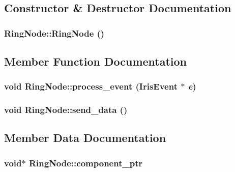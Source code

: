 \subsection{Constructor \& Destructor Documentation}
\hypertarget{classRingNode_ec76ce82eb33fd07810fc15f145e9043}{
\subsubsection[{RingNode}]{\setlength{\rightskip}{0pt plus 5cm}RingNode::RingNode ()}}
\label{classRingNode_ec76ce82eb33fd07810fc15f145e9043}




\subsection{Member Function Documentation}
\hypertarget{classRingNode_bf1a89c9a338856bb040b2aef89df6d9}{
\subsubsection[{process\_\-event}]{\setlength{\rightskip}{0pt plus 5cm}void RingNode::process\_\-event ({\bf IrisEvent} $\ast$ {\em e})}}
\label{classRingNode_bf1a89c9a338856bb040b2aef89df6d9}


\hypertarget{classRingNode_fa70c07a8733562f35198666826ab49a}{
\subsubsection[{send\_\-data}]{\setlength{\rightskip}{0pt plus 5cm}void RingNode::send\_\-data ()}}
\label{classRingNode_fa70c07a8733562f35198666826ab49a}




\subsection{Member Data Documentation}
\hypertarget{classRingNode_d7e7913b6ffa8a091a0fc7c0fc6a38b2}{
\subsubsection[{component\_\-ptr}]{\setlength{\rightskip}{0pt plus 5cm}void$\ast$ {\bf RingNode::component\_\-ptr}}}
\label{classRingNode_d7e7913b6ffa8a091a0fc7c0fc6a38b2}


